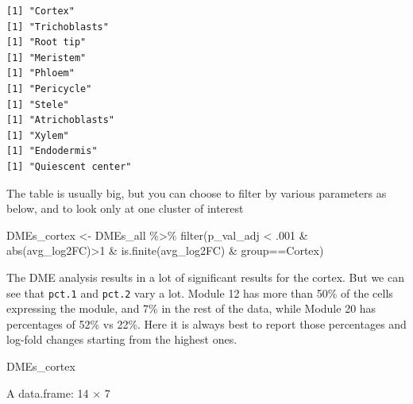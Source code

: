 \documentclass[
  letterpaper,
  DIV=11,
  numbers=noendperiod]{scrartcl}
\newenvironment{Shaded}{\begin{snugshade}}{\end{snugshade}}
\newcommand{\DecValTok}[1]{\textcolor[rgb]{0.68,0.00,0.00}{#1}}
\newcommand{\FunctionTok}[1]{\textcolor[rgb]{0.28,0.35,0.67}{#1}}
\newcommand{\NormalTok}[1]{\textcolor[rgb]{0.00,0.23,0.31}{#1}}
\newcommand{\OtherTok}[1]{\textcolor[rgb]{0.00,0.23,0.31}{#1}}
\newcommand{\SpecialCharTok}[1]{\textcolor[rgb]{0.37,0.37,0.37}{#1}}
\newcommand{\StringTok}[1]{\textcolor[rgb]{0.13,0.47,0.30}{#1}}
\begin{document}
\begin{verbatim}
[1] "Cortex"
[1] "Trichoblasts"
[1] "Root tip"
[1] "Meristem"
[1] "Phloem"
[1] "Pericycle"
[1] "Stele"
[1] "Atrichoblasts"
[1] "Xylem"
[1] "Endodermis"
[1] "Quiescent center"
\end{verbatim}

The table is usually big, but you can choose to filter by various
parameters as below, and to look only at one cluster of interest

\begin{Shaded}
\begin{Highlighting}[]
\NormalTok{DMEs\_cortex }\OtherTok{\textless{}{-}}\NormalTok{ DMEs\_all }\SpecialCharTok{\%\textgreater{}\%} \FunctionTok{filter}\NormalTok{(p\_val\_adj }\SpecialCharTok{\textless{}}\NormalTok{ .}\DecValTok{001} \SpecialCharTok{\&} \FunctionTok{abs}\NormalTok{(avg\_log2FC)}\SpecialCharTok{\textgreater{}}\DecValTok{1} 
                                       \SpecialCharTok{\&} \FunctionTok{is.finite}\NormalTok{(avg\_log2FC)}
                                       \SpecialCharTok{\&}\NormalTok{ group}\SpecialCharTok{==}\StringTok{\textquotesingle{}Cortex\textquotesingle{}}\NormalTok{)}
\end{Highlighting}
\end{Shaded}

The DME analysis results in a lot of significant results for the cortex.
But we can see that \texttt{pct.1} and \texttt{pct.2} vary a lot. Module
12 has more than 50\% of the cells expressing the module, and 7\% in the
rest of the data, while Module 20 has percentages of 52\% vs 22\%. Here
it is always best to report those percentages and log-fold changes
starting from the highest ones.

\begin{Shaded}
\begin{Highlighting}[]
\NormalTok{DMEs\_cortex}
\end{Highlighting}
\end{Shaded}

A data.frame: 14 × 7
\end{document}
